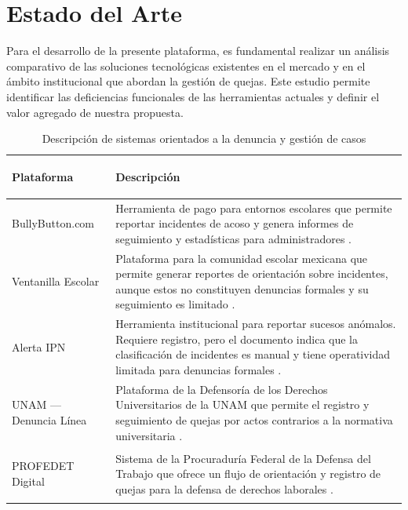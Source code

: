 \documentclass[12pt, letterpaper]{article}
\begin{document}
\section{Estado del Arte}
Para el desarrollo de la presente plataforma, es fundamental realizar un análisis comparativo de las soluciones tecnológicas existentes en el mercado y en el ámbito institucional que abordan la gestión de quejas. Este estudio permite identificar las deficiencias funcionales de las herramientas actuales y definir el valor agregado de nuestra propuesta.
\begin{table}[H]
    \centering
    \caption{Descripción de sistemas orientados a la denuncia y gestión de casos}
    \label{tab:sistemas_comparativos}
    \begin{tabular}{>{\bfseries\raggedright\arraybackslash}p{3.2cm} p{10.5cm}}
    \toprule
    \textbf{Plataforma} & \textbf{Descripción} \\
    \midrule
    BullyButton.com &
        Herramienta de pago para entornos escolares que permite reportar incidentes de acoso y genera informes de seguimiento y estadísticas para administradores \cite{bullybutton}. \\
    \addlinespace
    Ventanilla Escolar &
        Plataforma para la comunidad escolar mexicana que permite generar reportes de orientación sobre incidentes, aunque estos no constituyen denuncias formales y su seguimiento es limitado \cite{ventanilla_escolar}. \\
    \addlinespace
    Alerta IPN &
        Herramienta institucional para reportar sucesos anómalos. Requiere registro, pero el documento indica que la clasificación de incidentes es manual y tiene operatividad limitada para denuncias formales \cite{ipn_alerta}. \\
    \addlinespace
    UNAM --- Denuncia Línea &
        Plataforma de la Defensoría de los Derechos Universitarios de la UNAM que permite el registro y seguimiento de quejas por actos contrarios a la normativa universitaria \cite{unam_defensoria}. \\
    \addlinespace
    PROFEDET Digital &
        Sistema de la Procuraduría Federal de la Defensa del Trabajo que ofrece un flujo de orientación y registro de quejas para la defensa de derechos laborales \cite{profedet}. \\
    \bottomrule
    \end{tabular}
    \end{table}

\newpage
\end{document}

